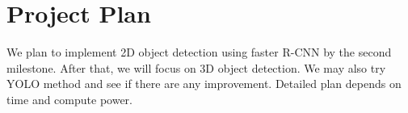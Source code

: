 \section{Project Plan}
We plan to implement 2D object detection using faster R-CNN by the second milestone. After that, we will focus on 3D object detection. We may also try YOLO\cite{yolo} method and see if there are any improvement. Detailed plan depends on time and compute power.



